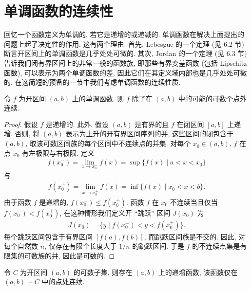 \documentclass[../../main.tex]{subfiles}
\begin{document}
\section{单调函数的连续性}\label{section:ch06-单调连续}

回忆一个函数定义为单调的, 若它是递增的或递减的. 单调函数在解决上面提出的问题上起了决定性的作用. 这有两个理由. 首先, Lebesgue 的一个定理 (见 6.2 节) 断言开区间上的单调函数是几乎处处可微的. 其次, Jordan 的一个定理 (见 6.3 节) 告诉我们闭有界区间上的非常一般的函数族, 即那些有界变差函数 (包括 Lipschitz 函数), 可以表示为两个单调函数的差, 因此它们在其定义域内部也是几乎处处可微的. 在这简短的预备的一节中我们考虑单调函数的连续性质.

\begin{theorem}\label{theorem:ch06-单调连续}
令 $f$ 为开区间 $(a,b)$ 上的单调函数. 则 $f$ 除了在 $(a,b)$ 中的可能的可数个点外连续.
\end{theorem}

\begin{proof}
假设 $f$ 是递增的. 此外, 假设 $(a,b)$ 是有界的且 $f$ 在闭区间 $[a,b]$ 上递增. 否则, 将 $(a,b)$ 表示为上升的开有界区间序列的并, 这些区间的闭包含于 $(a,b)$, 取该可数区间族的每个区间中不连续点的并集. 对每个 $x_{0}\in(a,b)$, $f$ 在点 $x_{0}$ 有左极限与右极限. 定义
\begin{align*}
f(x_{0}^{-})=\lim_{x\to x_{0}^{-}}f(x)=\sup\{f(x)\mid a<x<x_{0}\}
\end{align*}
与
\begin{align*}
f(x_{0}^{+})=\lim_{x\to x_{0}^{+}}f(x)=\inf\{f(x)\mid x_{0}<x<b\}.
\end{align*}
由于函数 $f$ 是递增的, $f(x_{0}^{-})\leqslant f(x_{0}^{+})$. 函数 $f$ 在 $x_{0}$ 不连续当且仅当 $f(x_{0}^{-})<f(x_{0}^{+})$, 在这种情形我们定义开 ``跳跃'' 区间 $J(x_{0})$ 为
\begin{align*}
J(x_{0})=\{y\mid f(x_{0}^{-})<y<f(x_{0}^{+})\}.
\end{align*}
每个跳跃区间包含于有界区间 $[f(a),f(b)]$, 而跳跃区间族是不交的. 因此, 对每个自然数 $n$, 仅存在有限个长度大于 $1/n$ 的跳跃区间. 于是 $f$ 的不连续点集是有限集的可数族的并, 因此是可数的.
\end{proof}

\begin{proposition}\label{proposition:ch06-不连续点集}
令 $C$ 为开区间 $(a,b)$ 的可数子集. 则存在 $(a,b)$ 上的递增函数, 该函数仅在 $(a,b)\sim C$ 中的点处连续.
\end{proposition}
\end{document}
